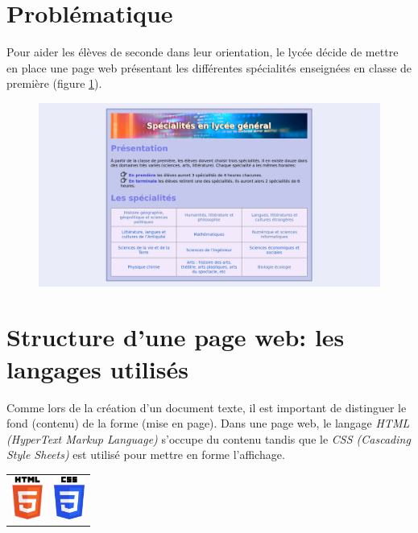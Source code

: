 \documentclass[a4paper,11pt]{article}
\begin{document}
\begin{Form}
\section{Problématique}
Pour aider les élèves de seconde dans leur orientation, le lycée décide de mettre en place une page web présentant les différentes spécialités enseignées en classe de première (figure \ref{pageweb}).
\begin{figure}[!h]
\centering
\includegraphics[width=14cm]{ressources/site.png}
\label{pageweb}
\end{figure}
\begin{center}
\end{center}
\section{Structure d'une page web: les langages utilisés}
Comme lors de la création d'un document texte, il est important de distinguer le fond (contenu) de la forme (mise en page). Dans une page web, le langage \emph{HTML (HyperText Markup Language)} s'occupe du contenu tandis que le \emph{CSS (Cascading Style Sheets)} est utilisé pour mettre en forme l'affichage.
\begin{center}
\begin{tabular}{cc}
\includegraphics[width=1cm]{ressources/html.png}
&
\includegraphics[width=1cm]{ressources/css.png}
 \\ 
\end{tabular} 
\end{center}


\end{Form}
\end{document}
